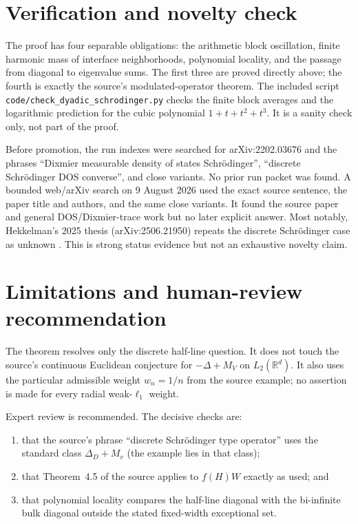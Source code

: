 \documentclass[11pt]{article}
\newcommand{\R}{\mathbb R}
\begin{document}
\section{Verification and novelty check}

The proof has four separable obligations: the arithmetic block oscillation,
finite harmonic mass of interface neighborhoods, polynomial locality, and the
passage from diagonal to eigenvalue sums.  The first three are proved directly
above; the fourth is exactly the source's modulated-operator theorem.  The
included script \texttt{code/check\_dyadic\_schrodinger.py} checks the finite
block averages and the logarithmic prediction for the cubic polynomial
$1+t+t^2+t^3$.  It is a sanity check only, not part of the proof.

Before promotion, the run indexes were searched for arXiv:2202.03676 and the
phrases ``Dixmier measurable density of states Schr\"odinger'', ``discrete
Schr\"odinger DOS converse'', and close variants.  No prior run packet was
found.  A bounded web/arXiv search on 9 August 2026 used the exact source
sentence, the paper title and authors, and the same close variants.  It found
the source paper and general DOS/Dixmier-trace work but no later explicit
answer.  Most notably, Hekkelman's 2025 thesis (arXiv:2506.21950) repeats the
discrete Schr\"odinger case as unknown \cite[Sec.~5.1]{Hekkelman}.  This is
strong status evidence but not an exhaustive novelty claim.

\section{Limitations and human-review recommendation}

The theorem resolves only the discrete half-line question.  It does not touch
the source's continuous Euclidean conjecture for $-\Delta+M_V$ on
$L_2(\R^d)$.  It also uses the particular admissible weight $w_n=1/n$ from
the source example; no assertion is made for every radial weak-$\ell_1$
weight.

Expert review is recommended.  The decisive checks are:
\begin{enumerate}
\item that the source's phrase ``discrete Schr\"odinger type operator'' uses
the standard class $\Delta_D+M_v$ (the example lies in that class);
\item that Theorem~4.5 of the source applies to $f(H)W$ exactly as used; and
\item that polynomial locality compares the half-line diagonal with the
bi-infinite bulk diagonal outside the stated fixed-width exceptional set.
\end{enumerate}
\end{document}
